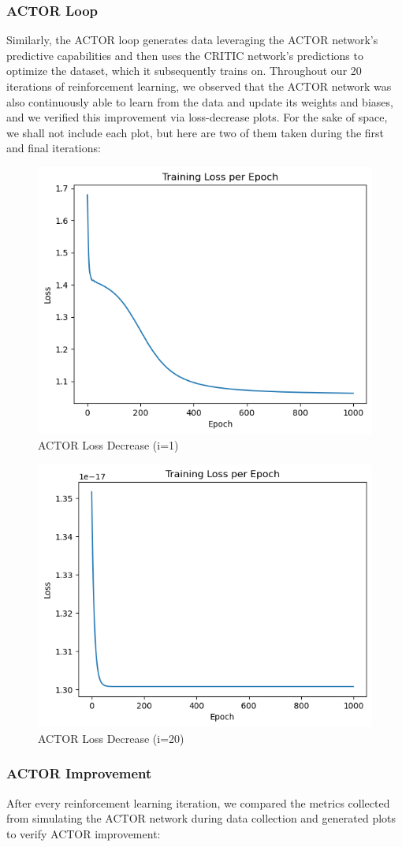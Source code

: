 \documentclass[11pt]{article}
\begin{document}
\subsubsection{ACTOR Loop}

Similarly, the ACTOR loop generates data leveraging the ACTOR network's predictive capabilities and then uses the CRITIC network's predictions to optimize the dataset, which it subsequently trains on. Throughout our 20 iterations of reinforcement learning, we observed that the ACTOR network was also continuously able to learn from the data and update its weights and biases, and we verified this improvement via loss-decrease plots. For the sake of space, we shall not include each plot, but here are two of them taken during the first and final iterations:

\begin{figure}[H]
    \centering
    \includegraphics[width=0.4\linewidth]{actorloss.png}
    \caption{ACTOR Loss Decrease (i=1)}
\end{figure}

\begin{figure}[H]
    \centering
    \includegraphics[width=0.4\linewidth]{actorloss2.png}
    \caption{ACTOR Loss Decrease (i=20)}
\end{figure}

\subsubsection{ACTOR Improvement}

After every reinforcement learning iteration, we compared the metrics collected from simulating the ACTOR network during data collection and generated plots to verify ACTOR improvement:
\end{document}
